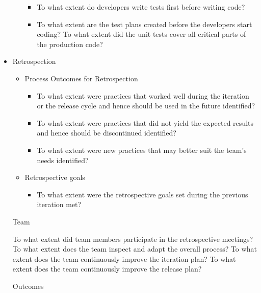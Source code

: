 \begin{appendices}
\begin{itemize}
\begin{itemize}
				\begin{itemize}
					\item To what extent do developers write tests first before writing code?
					\item To what extent are the test plans created before the developers start coding?
					\addition To what extent did the unit tests cover all critical parts of the production code?
				\end{itemize}
		\end{itemize}
	\item Retrospection
		\begin{itemize}
			\item Process Outcomes for Retrospection
				\begin{itemize}
					\item To what extent were practices that worked well during the iteration or the release cycle and hence should be used in the future identified?
					\item To what extent were practices that did not yield the expected results and hence should be discontinued identified?
					\item To what extent were new practices that may better suit the team's needs identified?
				\end{itemize}
		\end{itemize}
		\begin{itemize}
			\item Retrospective goals
				\begin{itemize}
					\item To what extent were the retrospective goals set during the previous iteration met?
				\end{itemize}
		\end{itemize}
		\begin{itemize}
			\addition Team
				\begin{itemize}
					\addition To what extent did team members participate in the retrospective meetings?
					\addition To what extent does the team inspect and adapt the overall process?
					\addition To what extent does the team continuously improve the iteration plan?
					\addition To what extent does the team continuously improve the release plan?
				\end{itemize}
		\end{itemize}
		\begin{itemize}
			\addition Outcomes
				\begin{itemize}

\end{itemize}
\end{itemize}
\end{itemize}
\end{appendices}
